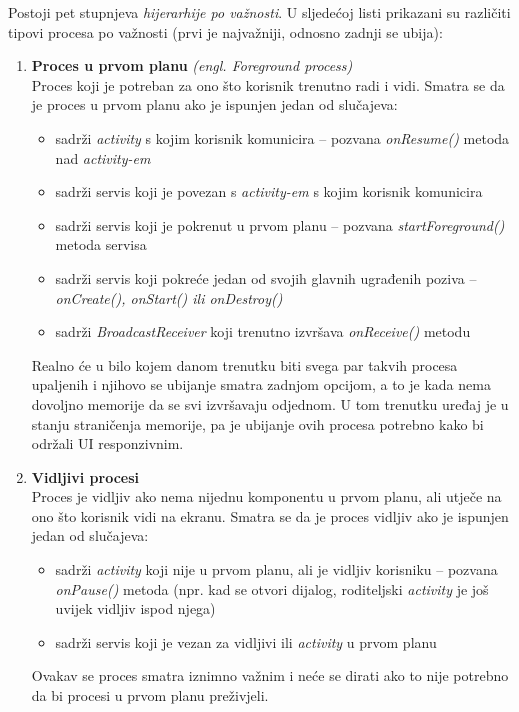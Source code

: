 \documentclass[times, utf8, zavrsni]{fer}
\begin{document}
Postoji pet stupnjeva \textit{hijerarhije po važnosti}. U sljedećoj listi prikazani su različiti tipovi procesa po važnosti (prvi je najvažniji, odnosno zadnji se ubija):

\begin{enumerate}
\item
\textbf{Proces u prvom planu} \textit{(engl. Foreground process)}\\
Proces koji je potreban za ono što korisnik trenutno radi i vidi. Smatra se da je proces u prvom planu ako je ispunjen jedan od slučajeva:
	\begin{itemize}
	\item sadrži \textit{activity} s kojim korisnik komunicira – pozvana \textit{onResume()} metoda nad \textit{activity-em}
	\item sadrži servis koji je povezan s \textit{activity-em} s kojim korisnik komunicira
	\item sadrži servis koji je pokrenut u prvom planu – pozvana \textit{startForeground()} metoda servisa
	\item sadrži servis koji pokreće jedan od svojih glavnih ugrađenih poziva – \textit{onCreate(), onStart() ili onDestroy()}
	\item sadrži \textit{BroadcastReceiver} koji trenutno izvršava \textit{onReceive()} metodu
	\end{itemize}
Realno će  u bilo kojem danom trenutku biti svega par takvih procesa upaljenih i njihovo se ubijanje smatra zadnjom opcijom, a to je kada nema dovoljno memorije da se svi izvršavaju odjednom. U tom trenutku uređaj je u stanju straničenja memorije, pa je ubijanje ovih procesa potrebno kako bi održali UI responzivnim.	
	
\item
\textbf{Vidljivi procesi}\\
Proces je vidljiv ako nema nijednu komponentu u prvom planu, ali utječe na ono što korisnik vidi na ekranu. Smatra se da je proces vidljiv ako je ispunjen jedan od slučajeva:
	\begin{itemize}
	\item sadrži \textit{activity} koji nije u prvom planu, ali je vidljiv korisniku – pozvana \textit{onPause()} metoda (npr. kad se otvori dijalog, roditeljski \textit{activity} je još uvijek vidljiv ispod njega)
	\item sadrži servis koji je vezan za vidljivi ili \textit{activity} u prvom planu
	\end{itemize}
Ovakav se proces smatra iznimno važnim i neće se dirati ako to nije potrebno da bi procesi u prvom planu preživjeli.


\end{enumerate}
\end{document}
